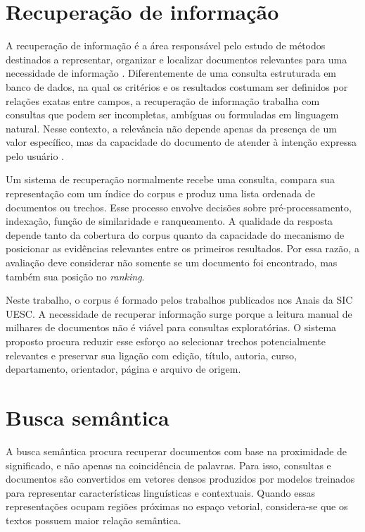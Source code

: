\section{Recuperação de informação}

A recuperação de informação é a área responsável pelo estudo de métodos destinados a representar, organizar e localizar documentos relevantes para uma necessidade de informação \cite{baeza2013ri}. Diferentemente de uma consulta estruturada em banco de dados, na qual os critérios e os resultados costumam ser definidos por relações exatas entre campos, a recuperação de informação trabalha com consultas que podem ser incompletas, ambíguas ou formuladas em linguagem natural. Nesse contexto, a relevância não depende apenas da presença de um valor específico, mas da capacidade do documento de atender à intenção expressa pelo usuário \cite{manning2008ir}.

Um sistema de recuperação normalmente recebe uma consulta, compara sua representação com um índice do corpus e produz uma lista ordenada de documentos ou trechos. Esse processo envolve decisões sobre pré-processamento, indexação, função de similaridade e ranqueamento. A qualidade da resposta depende tanto da cobertura do corpus quanto da capacidade do mecanismo de posicionar as evidências relevantes entre os primeiros resultados. Por essa razão, a avaliação deve considerar não somente se um documento foi encontrado, mas também sua posição no \textit{ranking}.

Neste trabalho, o corpus é formado pelos trabalhos publicados nos Anais da SIC UESC. A necessidade de recuperar informação surge porque a leitura manual de milhares de documentos não é viável para consultas exploratórias. O sistema proposto procura reduzir esse esforço ao selecionar trechos potencialmente relevantes e preservar sua ligação com edição, título, autoria, curso, departamento, orientador, página e arquivo de origem.

\section{Busca semântica}

A busca semântica procura recuperar documentos com base na proximidade de significado, e não apenas na coincidência de palavras. Para isso, consultas e documentos são convertidos em vetores densos produzidos por modelos treinados para representar características linguísticas e contextuais. Quando essas representações ocupam regiões próximas no espaço vetorial, considera-se que os textos possuem maior relação semântica.

